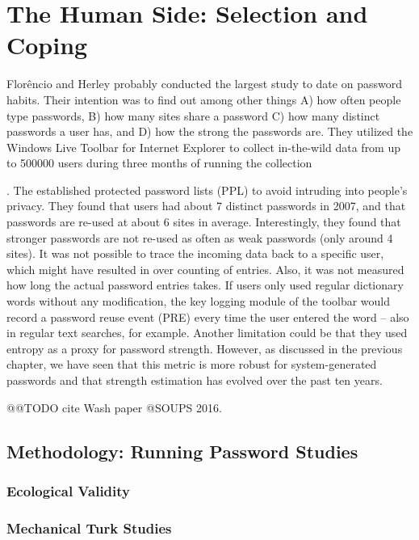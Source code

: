 \chapter[The Human Side: Selecting and Coping]{The Human Side: Selection and Coping}\label{chap:selection_coping_strategies}


Flor\^{e}ncio and Herley probably conducted the largest study to date on password habits. Their intention was to find out among other things A) how often people type passwords, B) how many sites share a password C) how many distinct passwords a user has, and D) how the strong the passwords are. They utilized the Windows Live Toolbar for Internet Explorer to collect in-the-wild data from up to 500000 users during three months of running the collection

\cite{Florencio2007LargeScaleStudyPasswordHabits}. The established protected password lists (PPL) to avoid intruding into people's privacy. They found that users had about 7 distinct passwords in 2007, and that passwords are re-used at about 6 sites in average. Interestingly, they found that stronger passwords are not re-used as often as weak passwords (only around 4 sites). It was not possible to trace the incoming data back to a specific user, which might have resulted in over counting of entries. Also, it was not measured how long the actual password entries takes. If users only used regular dictionary words without any modification, the key logging module of the toolbar would record a password reuse event (PRE) every time the user entered the word -- also in regular text searches, for example. Another limitation could be that they used entropy as a proxy for password strength. However, as discussed in the previous chapter, we have seen that this metric is more robust for system-generated passwords and that strength estimation has evolved over the past ten years. 


@@TODO cite Wash paper @SOUPS 2016.


\section{Methodology: Running Password Studies}
	\subsection{Ecological Validity}
	\subsection{Mechanical Turk Studies}
		
